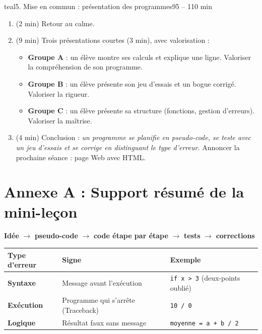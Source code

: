\documentclass[11pt,a4paper]{article}
\begin{document}
\begin{etape}{teal}{5. Mise en commun : présentation des programmes}{95 -- 110 min}
\begin{enumerate}
 \item (2 min) Retour au calme.
 \item (9 min) Trois présentations courtes (3 min), avec valorisation :
 \begin{itemize}
  \item \textbf{Groupe A} : un élève montre ses calculs et explique une ligne. Valoriser la compréhension de son programme.
  \item \textbf{Groupe B} : un élève présente son jeu d'essais et un bogue corrigé. Valoriser la rigueur.
  \item \textbf{Groupe C} : un élève présente sa structure (fonctions, gestion d'erreurs). Valoriser la maîtrise.
 \end{itemize}
 \item (4 min) Conclusion : \textit{un programme se planifie en pseudo-code, se teste avec un jeu d'essais et se corrige en distinguant le type d'erreur.} Annoncer la prochaine séance : page Web avec HTML.
\end{enumerate}
\end{etape}


\newpage
\section*{Annexe A : Support résumé de la mini-leçon}

\begin{tcolorbox}[colback=yellow!10,colframe=yellow!50!black]
\textbf{Idée} $\rightarrow$ \textbf{pseudo-code} $\rightarrow$ \textbf{code étape par étape} $\rightarrow$ \textbf{tests} $\rightarrow$ \textbf{corrections}
\end{tcolorbox}

\begin{tabularx}{\linewidth}{>{\bfseries}p{3.2cm}Y Y}
\toprule
Type d'erreur & Signe & Exemple\\
\midrule
Syntaxe & Message avant l'exécution & \texttt{if x > 3} (deux-points oublié)\\
Exécution & Programme qui s'arrête (Traceback) & \texttt{10 / 0}\\
Logique & Résultat faux sans message & \texttt{moyenne = a + b / 2}\\
\bottomrule
\end{tabularx}
\end{document}
